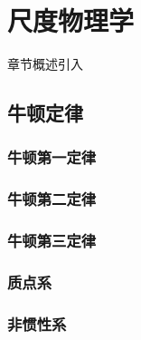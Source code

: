 \chapter{尺度物理学}\label{30}

章节概述引入

\section{牛顿定律}\label{3-1}

\subsection{牛顿第一定律}\label{3-1-1}

\subsection{牛顿第二定律}\label{3-1-2}

\subsection{牛顿第三定律}\label{3-1-3}

\subsection{质点系}\label{3-1-4}

\subsection{非惯性系}\label{3-1-5}